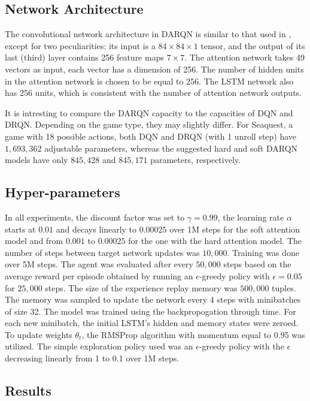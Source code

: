 \documentclass{article} \usepackage{nips15submit_e,times}
\begin{document}
\subsection{Network Architecture}

The convolutional network architecture in DARQN is similar to that used in \cite{mnih2015human}, except for two peculiarities: 
its input is a $84\times84\times1$ tensor, and the output of its last (third) layer contains 256 feature maps $7\times7$. The attention network takes 49 vectors as input, each vector has a dimension of 256. The number of hidden units in the attention network is chosen to be equal to 256. The LSTM network also has 256 units, which is consistent with the number of attention network outputs.

It is intresting to compare the DARQN capacity to the capacities of DQN and DRQN. Depending on the game type, they may slightly differ. For Seaquest, a game with 18 possible actions, both DQN and DRQN (with 1 unroll step) have $1,693,362$ adjustable parameters, whereas the suggested hard and soft DARQN models have only $845,428$ and $845,171$ parameters, respectively.

\subsection{Hyper-parameters}

In all experiments, the discount factor was set to $\gamma = 0.99$, the learning rate $\alpha$ starts at $0.01$ and decays linearly to $0.00025$ over 1M steps for the soft attention model and from $0.001$ to $0.00025$ for the one with the hard attention model. The number of steps between target network updates was $10,000$. Training was done over 5M steps. The agent was evaluated after every $50,000$ steps based on the average reward per episode obtained by running an $\epsilon$-greedy policy with $\epsilon = 0.05$ for $25,000$ steps. The size of the experience replay memory was $500,000$ tuples. The memory was sampled to update the network every 4 steps with minibatches of size 32. The model was trained using the backpropogation through time. For each new minibatch, the initial LSTM's hidden and memory states were zeroed. To update weights $\theta_t$, the RMSProp algorithm with momentum equal to 0.95 was utilized. The simple exploration policy used was an $\epsilon$-greedy policy with the $\epsilon$ decreasing linearly from 1 to 0.1 over 1M steps.

\subsection{Results}
\end{document}
